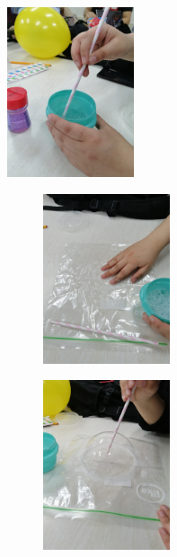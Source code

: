 \documentclass[a4paper,12pt]{article}
\begin{document}
\begin{figure}[h]
    \begin{subfigure}
        \raggedright
        \includegraphics[width=4cm, height=5cm]{imag/Exp2_00.jpg}
    \end{subfigure}
    \begin{subfigure}
        \centering
        \includegraphics[width=4cm, height=5cm]{imag/Exp2_01.jpg}
    \end{subfigure}
    \begin{subfigure}
        \raggedleft
        \includegraphics[width=4cm, height=5cm]{imag/Exp2_02.jpg}
    \end{subfigure}
\end{figure}
\end{document}
